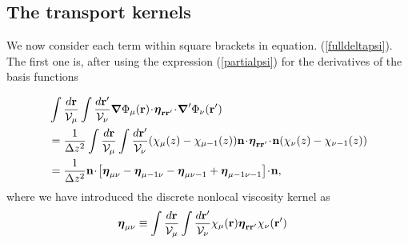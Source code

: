 \documentclass[b5paper,openright,10pt]{book}
\newcommand{\esc}{\!\cdot\!}
\begin{document}
\subsection{The transport kernels}
We   now  consider   each  term   within  square   brackets  in 
equation. (\ref{fulldeltapsi}). The first one is, after using the expression
(\ref{partialpsi}) for the derivatives of the basis functions

\begin{align}
&\int \frac{d{\bf r}}{{\cal V}_\mu}
\int \frac{d{\bf r}'}{{\cal V}_\nu}
\boldsymbol{\nabla}\Phi_\mu({\bf r})
\esc\boldsymbol{\eta}_{{\bf r}{\bf r}'}\esc
{\boldsymbol{\nabla}^\prime}\Phi_\nu({\bf r}')
\nonumber\\
&=
\frac{1}{\Delta z^2}\int \frac{d{\bf r}}{{\cal V}_\mu}
\int \frac{d{\bf r}'}{{\cal V}_\nu}
(\chi_\mu(z)-\chi_{\mu-1}(z))
{\bf n}\esc\boldsymbol{\eta}_{{\bf r}{\bf r}'}\esc{\bf n}(\chi_\nu(z)-\chi_{\nu-1}(z))
\nonumber\\
&=
\frac{1}{\Delta z^2} {\bf n}\esc\left[\boldsymbol{\eta}_{\mu\nu}-\boldsymbol{\eta}_{\mu-1\nu}-\boldsymbol{\eta}_{\mu\nu-1}+\boldsymbol{\eta}_{\mu-1\nu-1}\right]\esc{\bf n},
\label{TC1}
\end{align}
where we have introduced the discrete nonlocal viscosity kernel as
\begin{align}
\boldsymbol{\eta}_{\mu\nu}&\equiv  \int \frac{d{\bf r}}{{\cal V}_\mu}
\int \frac{d{\bf r}'}{{\cal V}_\nu}
\chi_\mu({\bf r})
\boldsymbol{\eta}_{{\bf r}{\bf r}'}\chi_\nu({\bf r}')
\label{s2disc}
\end{align}
\end{document}
